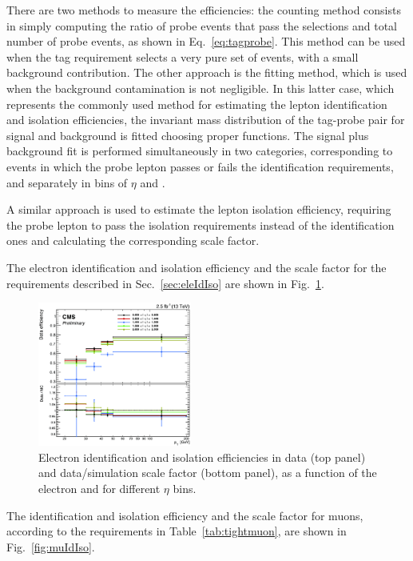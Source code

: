 There are two methods to measure the efficiencies: the counting method consists in simply computing the ratio of probe events that pass the selections and total number of probe events, as shown in Eq.~\eqref{eq:tagprobe}. This method can be used when the tag requirement selects a very pure set of events, with a small background contribution. The other approach is the fitting method, which is used when the background contamination is not negligible. In this latter case, which represents the commonly used method for estimating the lepton identification and isolation efficiencies, the invariant mass distribution of the tag-probe pair for signal and background is fitted choosing proper functions. The signal plus background fit is performed simultaneously in two categories, corresponding to events in which the probe lepton passes or fails the identification requirements, and separately in bins of $\eta$ and \pt.

A similar approach is used to estimate the lepton isolation efficiency, requiring the probe lepton to pass the isolation requirements instead of the identification ones and calculating the corresponding scale factor.

The electron identification and isolation efficiency and the scale factor for the requirements described in Sec.~\ref{sec:eleIdIso} are shown in Fig.~\ref{fig:eleIdIso}.

\begin{figure}[htb]
\centering
\includegraphics[width=0.45\textwidth]{images/eleIdIsoEff.pdf}
\caption{Electron identification and isolation efficiencies in data (top panel) and data/simulation scale factor (bottom panel), as a function of the electron \pt and for different $\eta$ bins.}\label{fig:eleIdIso}
\end{figure}
	
The identification and isolation efficiency and the scale factor for muons, according to the requirements in Table~\ref{tab:tightmuon}, are shown in Fig.~\ref{fig:muIdIso}.
	
